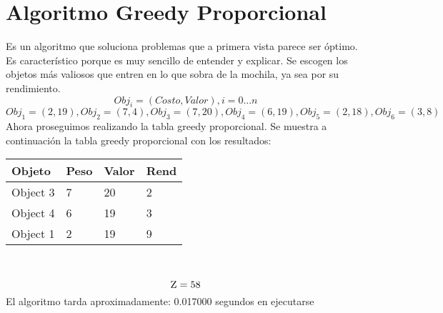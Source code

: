 \documentclass[10pt,letterpaper]{article}
\begin{document}
\section{Algoritmo Greedy Proporcional} 
        Es un algoritmo que soluciona problemas que a primera vista parece ser 
        óptimo. Es característico porque es muy sencillo de entender y explicar. 
        Se escogen los objetos más valiosos que entren en lo que sobra de la mochila, ya sea por su rendimiento. 
        \[ Obj_{i} = (Costo, Valor), i = 0...n \]
\[ Obj_{1} = (2, 19), Obj_{2} = (7, 4), Obj_{3} = (7, 20), Obj_{4} = (6, 19), Obj_{5} = (2, 18), Obj_{6} = (3, 8) \]
\newline Ahora proseguimos realizando la tabla greedy proporcional.
Se muestra a continuación la tabla greedy proporcional con los resultados: 
\begin{center}
\begin{tabu} to 0.6\textwidth { | X[l] | X[l] | X[l] | X[l] |} 
\hline
{}
\textbf{Objeto} & \textbf{Peso} & \textbf{Valor} & \textbf{Rend}\\
\hline
Object 3 & 7 & 20 & 2 \\
\hline
Object 4 & 6 & 19 & 3 \\
\hline
Object 1 & 2 & 19 & 9 \\
\hline
\end{tabu} \\
\end{center}
\[ \textsc{\normalsize Z}\\[0.5cm] = 58 \] 
\newline El algoritmo tarda aproximadamente: 0.017000 segundos en ejecutarse
\end{document}
